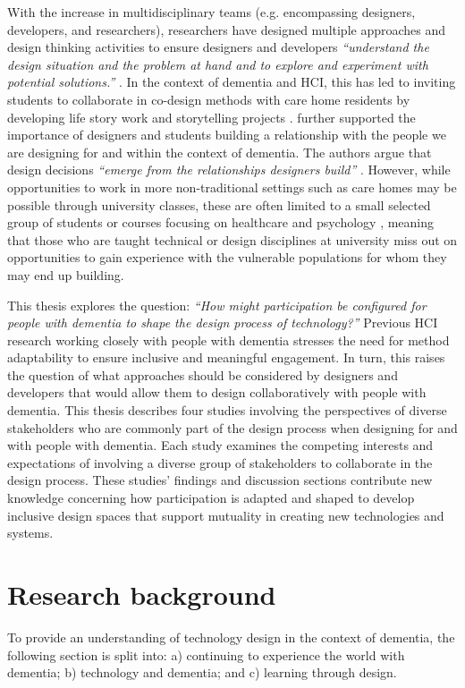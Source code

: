 With the increase in multidisciplinary teams (e.g. encompassing designers, developers, and researchers), researchers have designed multiple approaches and design thinking activities to ensure designers and developers  \textit{``understand the design situation and the problem at hand and to explore and experiment with potential solutions.''} \citep[p.21]{dalsgaard2017instruments}. In the context of dementia and HCI, this has led to inviting students to collaborate in co-design methods with care home residents by developing life story work \citep{foley_student_2020} and storytelling projects \citep{hannan_zeitgeist_2019}. \cite{hendriks_valuing_2018} further supported the importance of designers and students building a relationship with the people we are designing for and within the context of dementia. The authors argue that design decisions \textit{``emerge from the relationships designers build''} \citep[pg. 3]{hendriks_valuing_2018}. However, while opportunities to work in more non-traditional settings such as care homes may be possible through university classes, these are often limited to a small selected group of students or courses focusing on healthcare and psychology \citep{kinnunen_understanding_2018}, meaning that those who are taught technical or design disciplines at university miss out on opportunities to gain experience with the vulnerable populations for whom they may end up building.

This thesis explores the question: \textit{``How might participation be configured for people with dementia to shape the design process of technology?''} Previous HCI research working closely with people with dementia stresses the need for method adaptability to ensure inclusive and meaningful engagement. In turn, this raises the question of what approaches should be considered by designers and developers that would allow them to design collaboratively with people with dementia. This thesis describes four studies involving the perspectives of diverse stakeholders who are commonly part of the design process when designing for and with people with dementia. Each study examines the competing interests and expectations of involving a diverse group of stakeholders to collaborate in the design process. These studies' findings and discussion sections contribute new knowledge concerning how participation is adapted and shaped to develop inclusive design spaces that support mutuality in creating new technologies and systems.

\section{Research background}
\label{Intro: ResearchContext}
To provide an understanding of technology design in the context of dementia, the following section is split into: a) continuing to experience the world with dementia; b) technology and dementia; and c) learning through design. 

